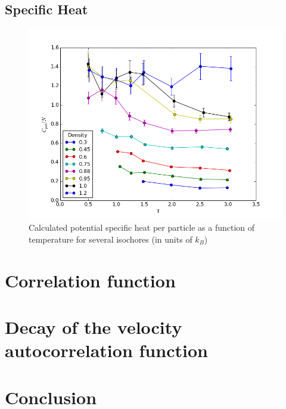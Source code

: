 \documentclass[aps,prl,reprint,groupedaddress]{revtex4-1}
\begin{document}
\subsection{Specific Heat}

\begin{figure}[ht]
	\includegraphics[scale=0.4]{heat_cap.png}
	\caption{Calculated potential specific heat per particle as a function of temperature for  several isochores (in units of $k_B$)\label{heat_cap_graph}}
\end{figure}

\section{Correlation function \label{correlation}}

\section{Decay of the velocity autocorrelation function \label{decay}}

\section{Conclusion \label{conclusion}}



\end{document}
